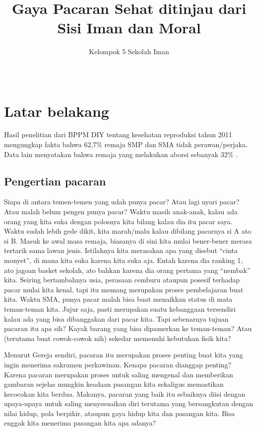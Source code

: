 \documentclass[11pt]{scrartcl}
\title{Gaya Pacaran Sehat ditinjau dari Sisi Iman dan Moral}
\author{Kelompok 5 Sekolah Iman}
\date{~}
\begin{document}
\maketitle
\vspace{-2cm}
\section*{Latar belakang}
Hasil penelitian dari BPPM DIY tentang kesehatan reproduksi tahun 2011 mengungkap fakta bahwa 62,7\% remaja SMP dan SMA tidak perawan/perjaka. Data lain menyatakan bahwa remaja yang melakukan aborsi sebanyak 32\% \cite{bppmdiy2011}.   

\subsection*{Pengertian pacaran}
Siapa di antara temen-temen yang udah punya pacar? Atau lagi nyari pacar? Atau malah belum pengen punya pacar? Waktu masih anak-anak, kalau ada orang yang kita suka dengan polosnya kita bilang kalau dia itu pacar saya. Waktu sudah lebih gede dikit, kita marah/malu kalau dibilang pacarnya si A ato si B. Masuk ke awal masa remaja, biasanya di sini kita mulai bener-bener merasa tertarik sama lawan jenis. Istilahnya kita merasakan apa yang disebut “cinta monyet”, di mana kita suka karena kita suka aja. Entah karena dia ranking 1, ato jagoan basket sekolah, ato bahkan karena dia orang pertama yang “nembak” kita. Seiring bertambahnya usia, perasaan cemburu ataupun posesif terhadap pacar mulai kita kenal, tapi itu memang merupakan proses pembelajaran buat kita. Waktu SMA, punya pacar malah bisa buat menaikkan status di mata teman-teman kita. Jujur saja, pasti merupakan suatu kebanggaan tersendiri kalau ada yang bisa dibanggakan dari pacar kita. Tapi sebenarnya tujuan pacaran itu apa sih? Kayak barang yang bisa dipamerkan ke teman-teman? Atau (terutama buat cowok-cowok nih) sekedar memenuhi kebutuhan fisik kita?

Menurut Gereja sendiri, pacaran itu merupakan proses penting buat kita yang ingin menerima sakramen perkawinan. Kenapa pacaran dianggap penting? Karena pacaran merupakan proses untuk saling mengenal dan memberikan gambaran sejelas mungkin keadaan pasangan kita sekaligus memastikan kecocokan kita berdua. Makanya, pacaran yang baik itu sebaiknya diisi dengan upaya-upaya untuk saling menyesuaikan diri terutama yang bersangkutan dengan nilai hidup, pola berpikir, ataupun gaya hidup kita dan pasangan kita. Bisa enggak kita menerima pasangan kita apa adanya?\cite{ryant2008}
\end{document}
